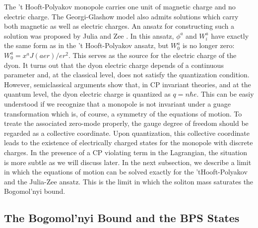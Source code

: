The 't Hooft-Polyakov monopole carries one unit of magnetic charge and
no electric charge. The Georgi-Glashow model also admits solutions
which carry both magnetic as well as electric charges. An ansatz for
constructing such a solution was proposed by Julia and Zee
\cite{Julia-Zee}. In this ansatz, $\phi^a$ and $W^a_i$ have exactly
the same form as in the 't Hooft-Polyakov ansatz, but $W^a_0$ is no
longer zero: $W^a_0=x^a J(aer)/er^2$. This serves as the source for
the electric charge of the dyon.  It turns out that the dyon electric
charge depends of a continuous parameter and, at the classical level,
does not satisfy the quantization condition. However, semiclassical
arguments \cite{TW1,GSW} show that, in CP invariant theories, and at
the quantum level, the dyon electric charge is quantized as $q=n\hbar
e$. This can be easiy understood if we recognize that a monopole is
not invariant under a guage transformation which is, of course, a
symmetry of the equations of motion. To treate the associated
zero-mode properly, the gauge degree of freedom should be regarded as
a collective coordinate. Upon quantization, this collective coordinate
leads to the existence of electrically charged states for the monopole
with discrete charges.  In the presence of a CP violating term in the
Lagrangian, the situation is more subtle as we will discuss later. In
the next subsection, we describe a limit in which the equations of
motion can be solved exactly for the 'tHooft-Polyakov and the
Julia-Zee ansatz. This is the limit in which the soliton mass
saturates the Bogomol'nyi bound.

\subsection{The Bogomol'nyi Bound and the BPS States}

